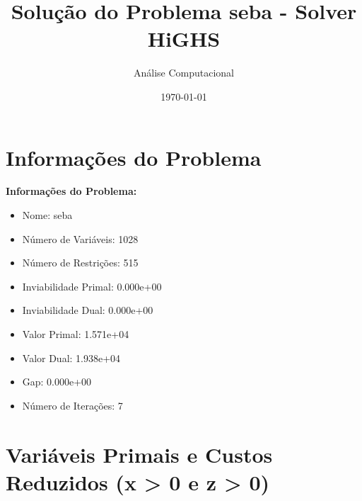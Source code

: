 \documentclass[12pt]{article}
\title{Solução do Problema seba - Solver HiGHS}
\author{Análise Computacional}
\date{\today}
\begin{document}
\maketitle

\section{Informações do Problema}

\textbf{Informações do Problema:}
\begin{itemize}
\item Nome: seba
\item Número de Variáveis: 1028
\item Número de Restrições: 515
\item Inviabilidade Primal: 0.000e+00
\item Inviabilidade Dual: 0.000e+00
\item Valor Primal: 1.571e+04
\item Valor Dual: 1.938e+04
\item Gap: 0.000e+00
\item Número de Iterações: 7
\end{itemize}


\section{Variáveis Primais e Custos Reduzidos (x > 0 e z > 0)}
\end{document}

